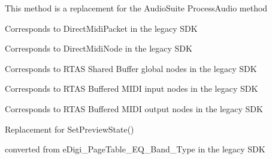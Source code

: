 \begin{DoxyRefList}
 This method is a replacement for the Audio\+Suite {\ttfamily Process\+Audio} method 
\item[Class \mbox{\hyperlink{a01709}{AAX\+\_\+\+CMidi\+Packet}} ]\label{a00802__porting_notes000003}%
%
 Corresponds to Direct\+Midi\+Packet in the legacy SDK  
\item[Class \mbox{\hyperlink{a01713}{AAX\+\_\+\+CMidi\+Stream}} ]\label{a00802__porting_notes000004}%
%
 Corresponds to Direct\+Midi\+Node in the legacy SDK  
\item[Member \mbox{\hyperlink{a00503_a5e1dffce35d05990dbbad651702678e4a2be91828f8c1dac20ab5dff136fc1fce}{AAX\+\_\+e\+MIDINode\+Type\+\_\+\+Global}} ]\label{a00802__porting_notes000029}%
%
 Corresponds to RTAS Shared Buffer global nodes in the legacy SDK  
\item[Member \mbox{\hyperlink{a00503_a5e1dffce35d05990dbbad651702678e4ae57de2b04978fe2e75f5bdeb034bda44}{AAX\+\_\+e\+MIDINode\+Type\+\_\+\+Local\+Input}} ]\label{a00802__porting_notes000027}%
%
 Corresponds to RTAS Buffered MIDI input nodes in the legacy SDK  
\item[Member \mbox{\hyperlink{a00503_a5e1dffce35d05990dbbad651702678e4acc1b5f2109c508b20a65b5e0fdcd643f}{AAX\+\_\+e\+MIDINode\+Type\+\_\+\+Local\+Output}} ]\label{a00802__porting_notes000028}%
%
 Corresponds to RTAS Buffered MIDI output nodes in the legacy SDK  
\item[Member \mbox{\hyperlink{a00503_afab5ea2cfd731fc8f163b6caa685406ea8ca3f7d5e93eecf945682f6fc55f5263}{AAX\+\_\+e\+Notification\+Event\+\_\+\+ASPreview\+State}} ]\label{a00802__porting_notes000021}%
%
 Replacement for {\ttfamily Set\+Preview\+State()}  
\item[Member \mbox{\hyperlink{a00503_aa169208a2ce713fa021e20deb2eaf608a99ca84cc3dae0f125082d36893a12bcd}{AAX\+\_\+e\+Page\+Table\+\_\+\+EQ\+\_\+\+Band\+\_\+\+Type}} ]\label{a00802__porting_notes000024}%
%
 converted from {\ttfamily e\+Digi\+\_\+\+Page\+Table\+\_\+\+EQ\+\_\+\+Band\+\_\+\+Type} in the legacy SDK 
\item[Member \mbox{\hyperlink{a00503_aa169208a2ce713fa021e20deb2eaf608ac5a06a293b7706191d3371813c47e999}{AAX\+\_\+e\+Page\+Table\+\_\+\+EQ\+\_\+\+In\+Circuit\+Polarity}} ]\label{a00802__porting_notes000025}%
%

\end{DoxyRefList}

